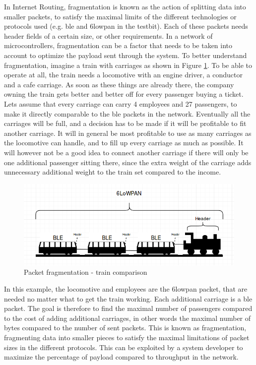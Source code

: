 \noindent In Internet Routing, fragmentation is known as the action of splitting data into smaller \glspl{packet}, to satisfy the maximal limits of the different technologies or protocols used (e.g. \gls{ble} and \gls{6lowpan} in the testbit). Each of these packets needs header fields of a certain size, or other requirements. In a network of \glspl{microcontroller}, fragmentation can be a factor that needs to be taken into account to optimize the \gls{payload} sent through the system. To better understand fragmentation, imagine a train with carriages as shown in Figure \ref{fig:trainExample}. To be able to operate at all, the train needs a locomotive with an engine driver, a conductor and a cafe carriage. As soon as these things are already there, the company owning the train gets better and better off for every passenger buying a ticket. Lets assume that every carriage can carry 4 employees and 27 passengers, to make it directly comparable to the \gls{ble} packets in the network. Eventually all the carriages will be full, and a decision has to be made if it will be profitable to fit another carriage. It will in general be most profitable to use as many carriages as the locomotive can handle, and to fill up every carriage as much as possible. It will however not be a good idea to connect another carriage if there will only be one additional passenger sitting there, since the extra weight of the carriage adds unnecessary additional weight to the train set compared to the income. 

\begin{figure}[ht]
    \centering
    \includegraphics[scale=0.5]{trainExample.png}    
    \caption{Packet fragmentation - train comparison}
    \label{fig:trainExample}
\end{figure}

\noindent In this example, the locomotive and employees are the \gls{6lowpan} packet, that are needed no matter what to get the train working. Each additional carriage is a \gls{ble} packet. The goal is therefore to find the maximal number of passengers compared to the cost of adding additional carriages, in other words the maximal number of bytes compared to the number of sent packets. This is known as fragmentation, fragmenting data into smaller pieces to satisfy the maximal limitations of packet sizes in the different protocols. This can be exploited by a system developer to maximize the percentage of \gls{payload} compared to \gls{throughput} in the network.
 
